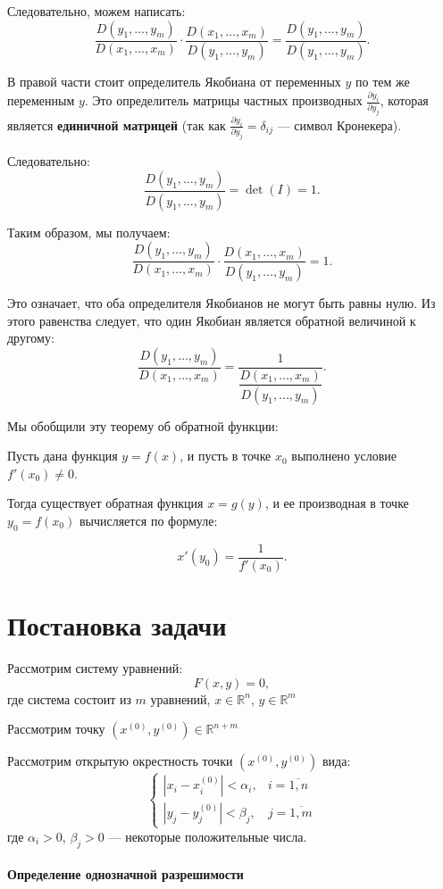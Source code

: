 \documentclass{article}
\begin{document}
Следовательно, можем написать:
\[
\frac{D(y_1, \dots, y_m)}{D(x_1, \dots, x_m)} \cdot \frac{D(x_1, \dots, x_m)}{D(y_1, \dots, y_m)} = \frac{D(y_1, \dots, y_m)}{D(y_1, \dots, y_m)}.
\]

В правой части стоит определитель Якобиана от переменных $y$ по тем же переменным $y$. Это определитель матрицы частных производных $\frac{\partial y_i}{\partial y_j}$, которая является \textbf{единичной матрицей} (так как $\frac{\partial y_i}{\partial y_j} = \delta_{ij}$ — символ Кронекера).

Следовательно:
\[
\frac{D(y_1, \dots, y_m)}{D(y_1, \dots, y_m)} = \det(I) = 1.
\]

Таким образом, мы получаем:
\[
\frac{D(y_1, \dots, y_m)}{D(x_1, \dots, x_m)} \cdot \frac{D(x_1, \dots, x_m)}{D(y_1, \dots, y_m)} = 1.
\]

Это означает, что оба определителя Якобианов не могут быть равны нулю. Из этого равенства следует, что один Якобиан является обратной величиной к другому:
\[
\frac{D(y_1, \dots, y_m)}{D(x_1, \dots, x_m)} = \frac{1}{\dfrac{D(x_1, \dots, x_m)}{D(y_1, \dots, y_m)}}.
\]

Мы обобщили эту теорему об обратной функции:

Пусть дана функция $y = f(x)$, и пусть в точке $x_0$ выполнено условие $f'(x_0) \neq 0$.

Тогда существует обратная функция $x = g(y)$, и ее производная в точке $y_0 = f(x_0)$ вычисляется по формуле:

\[
x'(y_0) = \frac{1}{f'(x_0)}.
\]


\section*{Постановка задачи}

Рассмотрим систему уравнений:
\begin{equation}
F(x, y) = 0, \tag{1}
\end{equation}
где система состоит из $m$ уравнений, $x \in \mathbb{R}^n$, $y \in \mathbb{R}^m$

Рассмотрим точку $(x^{(0)}, y^{(0)}) \in \mathbb{R}^{n+m}$

Рассмотрим открытую окрестность точки $(x^{(0)}, y^{(0)})$ вида:
\begin{equation}
\begin{cases}
|x_i - x_i^{(0)}| < \alpha_i, & i = \overline{1,n} \\
|y_j - y_j^{(0)}| < \beta_j, & j = \overline{1,m}
\end{cases}
\tag{2}
\end{equation}
где $\alpha_i > 0$, $\beta_j > 0$ — некоторые положительные числа.
\\\\
\textbf{Определение однозначной разрешимости}
\end{document}

